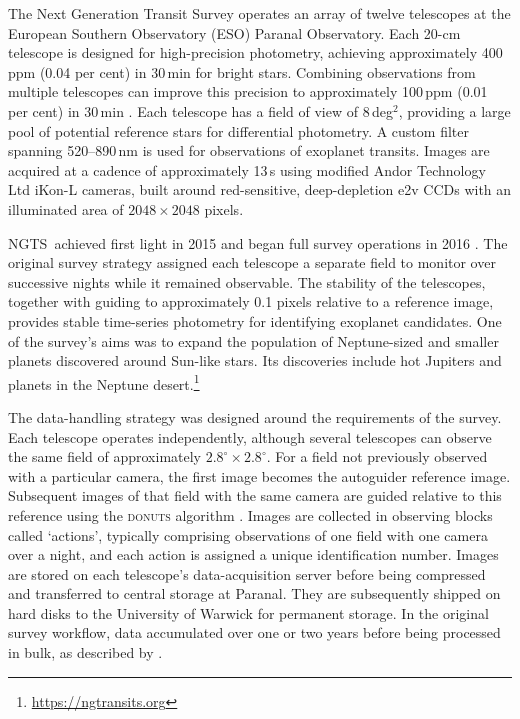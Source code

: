 \documentclass[fleqn,usenatbib]{mnras}
\newcommand{\ngts}{{NGTS}}
\begin{document}
The Next Generation Transit Survey \citep[\ngts;][]{2018MNRAS.475.4476W} operates an array of twelve telescopes at the European Southern Observatory (ESO) Paranal Observatory. Each 20-cm telescope is designed for high-precision photometry, achieving approximately 400\,ppm (0.04 per cent) in 30\,min for bright stars. Combining observations from multiple telescopes can improve this precision to approximately 100\,ppm (0.01 per cent) in 30\,min \citep{2020MNRAS.494.5872B}. Each telescope has a field of view of 8\,deg$^2$, providing a large pool of potential reference stars for differential photometry. A custom filter spanning 520--890\,nm is used for observations of exoplanet transits. Images are acquired at a cadence of approximately 13\,s using modified Andor Technology Ltd iKon-L cameras, built around red-sensitive, deep-depletion e2v CCDs with an illuminated area of $2048\times2048$ pixels.

\ngts\ achieved first light in 2015 and began full survey operations in 2016 \citep{2018MNRAS.475.4476W}. The original survey strategy assigned each telescope a separate field to monitor over successive nights while it remained observable. The stability of the telescopes, together with guiding to approximately 0.1 pixels relative to a reference image, provides stable time-series photometry for identifying exoplanet candidates. One of the survey's aims was to expand the population of Neptune-sized and smaller planets discovered around Sun-like stars. Its discoveries include hot Jupiters and planets in the Neptune desert.\footnote{\url{https://ngtransits.org}}

The data-handling strategy was designed around the requirements of the survey. Each telescope operates independently, although several telescopes can observe the same field of approximately $2.8^{\circ}\times2.8^{\circ}$. For a field not previously observed with a particular camera, the first image becomes the autoguider reference image. Subsequent images of that field with the same camera are guided relative to this reference using the \textsc{donuts} algorithm \citep{2013PASP..125..548M}. Images are collected in observing blocks called `actions', typically comprising observations of one field with one camera over a night, and each action is assigned a unique identification number. Images are stored on each telescope's data-acquisition server before being compressed and transferred to central storage at Paranal. They are subsequently shipped on hard disks to the University of Warwick for permanent storage. In the original survey workflow, data accumulated over one or two years before being processed in bulk, as described by \citet{2018MNRAS.475.4476W}.
\end{document}

